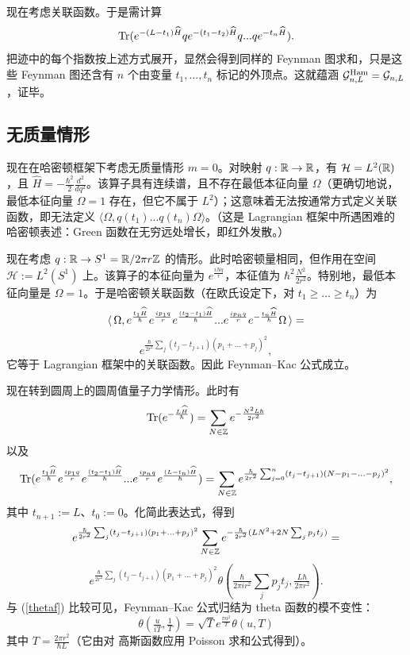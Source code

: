 现在考虑关联函数。于是需计算
$$
\Tr(e^{-(L-t_1)\widehat H}qe^{-(t_1-t_2)\widehat H}q...qe^{-t_n\widehat
    H}).
$$
把迹中的每个指数按上述方式展开，显然会得到同样的 Feynman 图求和，只是这些 Feynman 图还含有 $n$ 个由变量 $t_1,...,t_n$ 标记的外顶点。这就蕴涵 $\G_{n,L}^{\rm Ham}=\G_{n,L}$，证毕。

\subsection{无质量情形}

现在在哈密顿框架下考虑无质量情形 $m=0$。对映射 $q:\Bbb R\to \Bbb R$，有 ${\mathcal H}=L^2(\Bbb R)$，且 $\widehat H=-\frac{\hbar^2}{2}\frac{d^2}{dq^2}$。该算子具有连续谱，且不存在最低本征向量 $\Omega$（更确切地说，最低本征向量 $\Omega=1$ 存在，但它不属于 $L^2$）；这意味着无法按通常方式定义关联函数，即无法定义 $\langle\Omega,q(t_1)...q(t_n)\Omega\rangle$。（这是 Lagrangian 框架中所遇困难的哈密顿表述：Green 函数在无穷远处增长，即红外发散。）

现在考虑 $q: \Bbb R\to S^1=\Bbb R/2\pi r\Bbb Z$ 的情形。此时哈密顿量相同，但作用在空间 ${\mathcal H}:=L^2(S^1)$ 上。该算子的本征向量为 $e^{\frac{iNq}{r}}$，本征值为 $\hbar^2 \frac{N^2}{2r^2}$。特别地，最低本征向量是 $\Omega=1$。于是哈密顿关联函数（在欧氏设定下，对 $t_1\ge...\ge t_n$）为
$$
\la\Omega,e^{\frac{t_1\widehat H}{\hbar}}e^{\frac{ip_1q}{r}}e^{\frac{(t_2-t_1)\widehat H}{\hbar}}...
e^{\frac{ip_nq}{r}}e^{-\frac{t_n\widehat H}{\hbar}}\Omega\ra=
$$
$$
e^{\frac{\hbar}{2r^2}\sum_j (t_{j}-t_{j+1})(p_1+...+p_{j})^2},
$$
它等于 Lagrangian 框架中的关联函数。因此 Feynman–Kac 公式成立。

现在转到圆周上的圆周值量子力学情形。此时有
$$
\Tr(e^{-\frac{L\widehat H}{\hbar}})=\sum_{N\in \Bbb Z} e^{-\frac{N^2L\hbar}{2r^2}}
$$ 
以及
$$
\Tr(e^{\frac{t_1\widehat H}{\hbar}}e^{\frac{ip_1q}{r}}e^{\frac{(t_2-t_1)\widehat H}{\hbar}}...
e^{\frac{ip_nq}{r}}e^{\frac{(L-t_n)\widehat H}{\hbar}})=
\sum_{N\in \Bbb Z}e^{\frac{\hbar}{2r^2}\sum_{j=0}^{n} (t_j-t_{j+1})(N-p_1-...-p_{j})^2},
$$
其中 $t_{n+1}:=L$、$t_0:=0$。化简此表达式，得到
$$
e^{\frac{\hbar}{2r^2}\sum_j (t_j-t_{j+1})(p_1+...+p_j)^2}
\sum_{N\in \Bbb Z} e^{-\frac{\hbar}{2r^2} (LN^2+2N\sum_j p_jt_j)}=
$$
$$
e^{\frac{\hbar}{2r^2}\sum_j (t_j-t_{j+1})(p_1+...+p_j)^2}
\theta(\tfrac{\hbar}{2\pi ir^2} \sum_j p_jt_j,\tfrac{L\hbar}{2\pi r^2}).
$$
与 (\ref{thetaf}) 比较可见，Feynman–Kac 公式归结为 theta 函数的模不变性：
$$
\theta(\tfrac{u}{iT},\tfrac{1}{T})=\sqrt{T} e^{\frac{\pi u^2}{T}}\theta(u,T)
$$
其中 $T=\frac{2\pi r^2}{\hbar L}$（它由对 高斯函数应用 Poisson 求和公式得到）。

